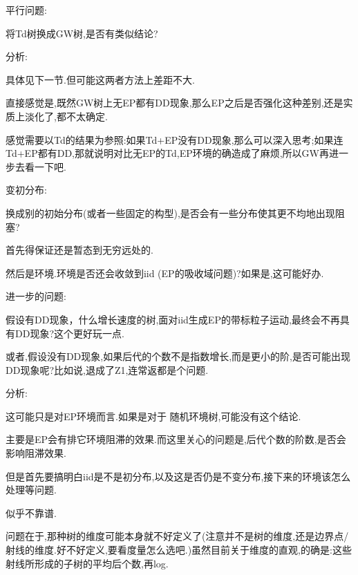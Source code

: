 \documentclass[a4paper,oneside]{ctexbook}
\begin{document}
				平行问题:

					\begin{que}

						将Td树换成GW树,是否有类似结论?
					
					\end{que}

					分析:

						具体见下一节.但可能这两者方法上差距不大.

						直接感觉是,既然GW树上无EP都有DD现象,那么EP之后是否强化这种差别,还是实质上淡化了,都不太确定.

						感觉需要以Td的结果为参照:如果Td+EP没有DD现象,那么可以深入思考;如果连Td+EP都有DD,那就说明对比无EP的Td,EP环境的确造成了麻烦,所以GW再进一步去看一下吧.

				变初分布:

					\begin{que}

						换成别的初始分布(或者一些固定的构型),是否会有一些分布使其更不均地出现阻塞?
					
					\end{que}

					首先得保证还是暂态到无穷远处的.

					然后是环境.环境是否还会收敛到iid (EP的吸收域问题)?如果是,这可能好办.


				进一步的问题:

					\begin{que}[更多或更少的后代是否抵消或产生DD现象]

						假设有DD现象，什么增长速度的树,面对iid生成EP的带标粒子运动,最终会不再具有DD现象?这个更好玩一点.

						或者,假设没有DD现象,如果后代的个数不是指数增长,而是更小的阶,是否可能出现DD现象呢?比如说,退成了Z1,连常返都是个问题.
					
					\end{que}

					分析:

						这可能只是对EP环境而言.如果是对于 随机环境树,可能没有这个结论.

							主要是EP会有排它环境阻滞的效果.而这里关心的问题是,后代个数的阶数,是否会影响阻滞效果.

							但是首先要搞明白iid是不是初分布,以及这是否仍是不变分布,接下来的环境该怎么处理等问题.

						似乎不靠谱.

							问题在于,那种树的维度可能本身就不好定义了(注意并不是树的维度,还是边界点/射线的维度.好不好定义,要看度量怎么选吧.)虽然目前关于维度的直观,的确是:这些射线所形成的子树的平均后个数,再log.
\end{document}
